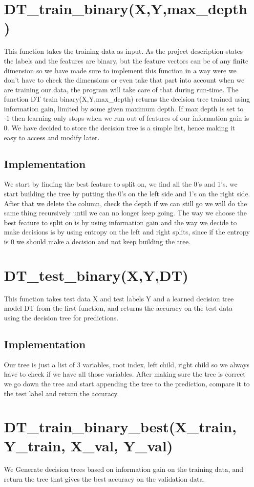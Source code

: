 \documentclass{article}
\begin{document}
\section{DT\_train\_binary(X,Y,max\_depth)}
This function takes the training data as input. As the project description states the labels and the features are binary, but the feature vectors can be of any finite dimension so we have made sure to implement this function in a way were we don't have to check the dimensions or even take that part into account when we are training our data, the program will take care of that during run-time. The function DT train binary(X,Y,max\_depth) returns the decision tree trained
using information gain, limited by some given maximum depth. If max depth is set to -1 then learning only
stops when we run out of features of our information gain is 0. We have decided to store the decision tree is a simple list, hence making it easy to access and modify later.
\subsection{Implementation}
We start by finding the best feature to split on, we find all the 0's and 1's. we start building the tree by putting the 0's on the left side and 1's on the right side. After that we delete the column, check the depth if we can still go we will do the same thing recursively until we can no longer keep going. The way we choose the best feature to split on is by using information gain and the way we decide to make decisions is by using entropy on the left and right splits, since if the entropy is 0 we should make a decision and not keep building the tree.
\section{DT\_test\_binary(X,Y,DT)}
This function takes test data X and test labels Y and a learned decision tree model DT from the first function, and returns the accuracy on the test data using the decision tree for predictions.
\subsection{Implementation}
Our tree is just a list of 3 variables, root index, left child, right child so we always have to check if we have all those variables. After making sure the tree is correct we go down the tree and start appending the tree to the prediction, compare it to the test label and return the accuracy.
\section{DT\_train\_binary\_best(X\_train, Y\_train, X\_val, Y\_val)}
We Generate decision trees based on information gain on the training data, and return the tree that gives the best accuracy on the validation data. 
\end{document}
